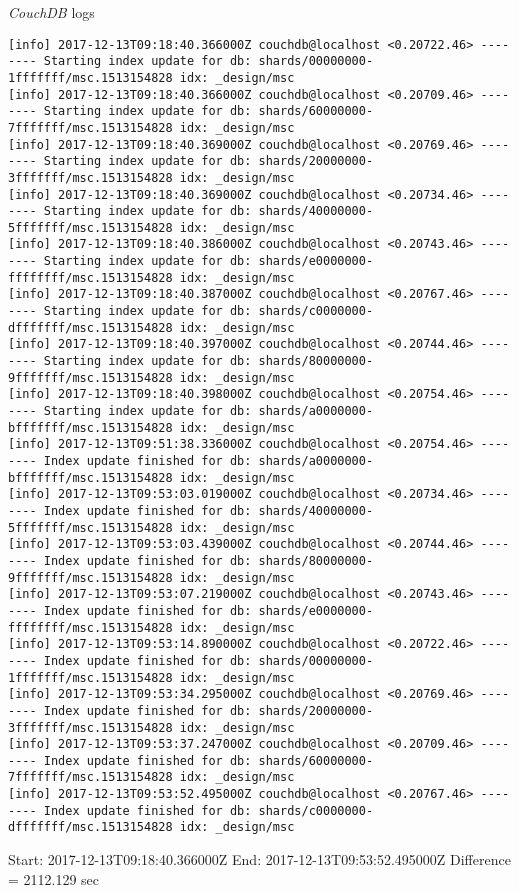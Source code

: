 \textit{CouchDB} logs
\begin{verbatim}
[info] 2017-12-13T09:18:40.366000Z couchdb@localhost <0.20722.46> -------- Starting index update for db: shards/00000000-1fffffff/msc.1513154828 idx: _design/msc
[info] 2017-12-13T09:18:40.366000Z couchdb@localhost <0.20709.46> -------- Starting index update for db: shards/60000000-7fffffff/msc.1513154828 idx: _design/msc
[info] 2017-12-13T09:18:40.369000Z couchdb@localhost <0.20769.46> -------- Starting index update for db: shards/20000000-3fffffff/msc.1513154828 idx: _design/msc
[info] 2017-12-13T09:18:40.369000Z couchdb@localhost <0.20734.46> -------- Starting index update for db: shards/40000000-5fffffff/msc.1513154828 idx: _design/msc
[info] 2017-12-13T09:18:40.386000Z couchdb@localhost <0.20743.46> -------- Starting index update for db: shards/e0000000-ffffffff/msc.1513154828 idx: _design/msc
[info] 2017-12-13T09:18:40.387000Z couchdb@localhost <0.20767.46> -------- Starting index update for db: shards/c0000000-dfffffff/msc.1513154828 idx: _design/msc
[info] 2017-12-13T09:18:40.397000Z couchdb@localhost <0.20744.46> -------- Starting index update for db: shards/80000000-9fffffff/msc.1513154828 idx: _design/msc
[info] 2017-12-13T09:18:40.398000Z couchdb@localhost <0.20754.46> -------- Starting index update for db: shards/a0000000-bfffffff/msc.1513154828 idx: _design/msc
[info] 2017-12-13T09:51:38.336000Z couchdb@localhost <0.20754.46> -------- Index update finished for db: shards/a0000000-bfffffff/msc.1513154828 idx: _design/msc
[info] 2017-12-13T09:53:03.019000Z couchdb@localhost <0.20734.46> -------- Index update finished for db: shards/40000000-5fffffff/msc.1513154828 idx: _design/msc
[info] 2017-12-13T09:53:03.439000Z couchdb@localhost <0.20744.46> -------- Index update finished for db: shards/80000000-9fffffff/msc.1513154828 idx: _design/msc
[info] 2017-12-13T09:53:07.219000Z couchdb@localhost <0.20743.46> -------- Index update finished for db: shards/e0000000-ffffffff/msc.1513154828 idx: _design/msc
[info] 2017-12-13T09:53:14.890000Z couchdb@localhost <0.20722.46> -------- Index update finished for db: shards/00000000-1fffffff/msc.1513154828 idx: _design/msc
[info] 2017-12-13T09:53:34.295000Z couchdb@localhost <0.20769.46> -------- Index update finished for db: shards/20000000-3fffffff/msc.1513154828 idx: _design/msc
[info] 2017-12-13T09:53:37.247000Z couchdb@localhost <0.20709.46> -------- Index update finished for db: shards/60000000-7fffffff/msc.1513154828 idx: _design/msc
[info] 2017-12-13T09:53:52.495000Z couchdb@localhost <0.20767.46> -------- Index update finished for db: shards/c0000000-dfffffff/msc.1513154828 idx: _design/msc
\end{verbatim}

Start: 2017-12-13T09:18:40.366000Z
End: 2017-12-13T09:53:52.495000Z
Difference = 2112.129 sec
